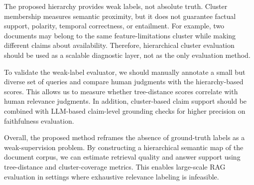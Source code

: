 \documentclass[11pt]{article}
\begin{document}
The proposed hierarchy provides weak labels, not absolute truth. Cluster membership measures semantic proximity, but it does not guarantee factual support, polarity, temporal correctness, or entailment. For example, two documents may belong to the same feature-limitations cluster while making different claims about availability. Therefore, hierarchical cluster evaluation should be used as a scalable diagnostic layer, not as the only evaluation method.

To validate the weak-label evaluator, we should manually annotate a small but diverse set of queries and compare human judgments with the hierarchy-based scores. This allows us to measure whether tree-distance scores correlate with human relevance judgments. In addition, cluster-based claim support should be combined with LLM-based claim-level grounding checks for higher precision on faithfulness evaluation.

Overall, the proposed method reframes the absence of ground-truth labels as a weak-supervision problem. By constructing a hierarchical semantic map of the document corpus, we can estimate retrieval quality and answer support using tree-distance and cluster-coverage metrics. This enables large-scale RAG evaluation in settings where exhaustive relevance labeling is infeasible.
\end{document}
